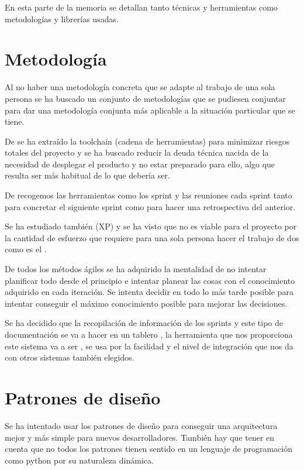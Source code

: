
En esta parte de la memoria se detallan tanto técnicas y herramientas como metodologías y librerías usadas.


\section{Metodología}

Al no haber una metodología concreta que se adapte al trabajo de una sola persona se ha buscado un conjunto de metodologías que se pudiesen conjuntar para dar una metodología conjunta más aplicable a la situación particular que se tiene. 

De  se ha extraído la toolchain (cadena de herramientas) para minimizar riesgos totales del proyecto y se ha buscado reducir la deuda técnica nacida de la necesidad de desplegar el producto y no estar preparado para ello, algo que resulta ser más habitual de lo que debería ser.

De  recogemos las herramientas como los sprint y las reuniones cada sprint tanto para concretar el siguiente sprint como para hacer una retrospectiva del anterior. 

Se ha estudiado también  (XP) y se ha visto que no es viable para el proyecto por la cantidad de esfuerzo que requiere para una sola persona hacer el trabajo de dos como es el . 

De todos los métodos ágiles se ha adquirido la mentalidad de no intentar planificar todo desde el principio e intentar planear las cosas con el conocimiento adquirido en cada iteración. Se intenta decidir en todo lo más tarde posible para intentar conseguir el máximo conocimiento posible para mejorar las decisiones.

Se ha decidido que la recopilación de información de los sprints y este tipo de documentación se va a hacer en un tablero , la herramienta que nos proporciona este  sistema va a ser , se usa por la facilidad y el nivel de integración que nos da con otros sistemas también elegidos.


\section{Patrones de diseño}

Se ha intentado usar los patrones de diseño para conseguir una arquitectura mejor y más simple para nuevos desarrolladores. También hay que tener en cuenta que no todos los patrones tienen sentido en un lenguaje de programación como python por su naturaleza dinámica.

